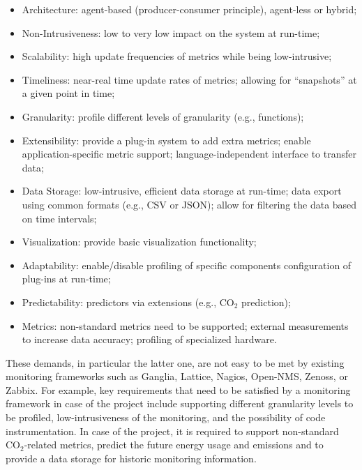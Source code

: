 \documentclass[10pt,letterpaper]{IEEEtran}
\begin{document}
\begin{itemize}
\item Architecture:
agent-based (producer-consumer principle), agent-less or hybrid;


\item Non-Intrusiveness:
low to very low impact on the system at run-time;

\item Scalability:
high update frequencies of metrics while being low-intrusive; 

\item Timeliness: near-real time update rates of metrics; allowing for “snapshots” at a given point in time;

\item Granularity: profile different levels of granularity (e.g., functions);

\item Extensibility: provide a plug-in system to add extra metrics;
enable application-specific metric support; language-independent interface to transfer data;

\item Data Storage:
low-intrusive, efficient data storage at run-time; data export using common formats (e.g., CSV or JSON);
allow for filtering the data based on time intervals;

\item Visualization: provide basic visualization functionality;

\item Adaptability: enable/disable profiling of specific components configuration of plug-ins at run-time;

\item Predictability: predictors via extensions (e.g., $\mathrm{CO_2}$ prediction);

\item Metrics: non-standard metrics need to be supported;
external measurements to increase data accuracy; profiling of specialized hardware.
\end{itemize}

These demands, in particular the latter one, are not easy to be met by existing monitoring frameworks
such as Ganglia, Lattice, Nagios, Open-NMS, Zenoss, or Zabbix.
For example, key requirements that need to be satisfied by a monitoring framework in case of the \EXCESS project include
supporting different granularity levels to be profiled, low-intrusiveness of the monitoring, and the possibility of
code instrumentation. In case of the \ECO project, it is required to support non-standard $\mathrm{CO_2}$-related metrics,
predict the future energy usage and emissions and to provide a data storage for historic monitoring information.
\end{document}
